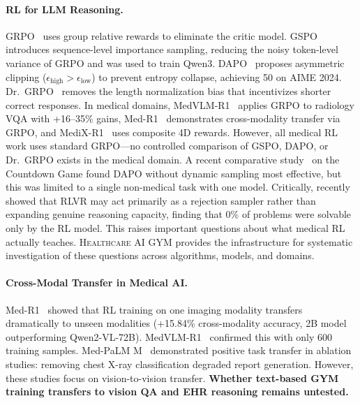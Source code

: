 \documentclass{article}
\newcommand{\gym}{\textsc{Healthcare AI GYM}}
\begin{document}
\paragraph{RL for LLM Reasoning.}
GRPO~\citep{shao2024deepseekmath} uses group relative rewards to eliminate the critic model. GSPO~\citep{gspo2025} introduces sequence-level importance sampling, reducing the noisy token-level variance of GRPO and was used to train Qwen3. DAPO~\citep{dapo2025} proposes asymmetric clipping ($\epsilon_{\text{high}} > \epsilon_{\text{low}}$) to prevent entropy collapse, achieving 50 on AIME 2024. Dr.~GRPO~\citep{liu2025drgrpo} removes the length normalization bias that incentivizes shorter correct responses. In medical domains, MedVLM-R1~\citep{pan2025medvlmr1} applies GRPO to radiology VQA with +16--35\% gains, Med-R1~\citep{lai2025medr1} demonstrates cross-modality transfer via GRPO, and MediX-R1~\citep{medixr1} uses composite 4D rewards. However, all medical RL work uses standard GRPO---no controlled comparison of GSPO, DAPO, or Dr.~GRPO exists in the medical domain. A recent comparative study~\citep{rl_comparison2025} on the Countdown Game found DAPO without dynamic sampling most effective, but this was limited to a single non-medical task with one model. Critically, \citet{yue2025rlvr} recently showed that RLVR may act primarily as a rejection sampler rather than expanding genuine reasoning capacity, finding that 0\% of problems were solvable only by the RL model. This raises important questions about what medical RL actually teaches. \gym{} provides the infrastructure for systematic investigation of these questions across algorithms, models, and domains.

\paragraph{Cross-Modal Transfer in Medical AI.}
Med-R1~\citep{lai2025medr1} showed that RL training on one imaging modality transfers dramatically to unseen modalities (+15.84\% cross-modality accuracy, 2B model outperforming Qwen2-VL-72B). MedVLM-R1~\citep{pan2025medvlmr1} confirmed this with only 600 training samples. Med-PaLM M~\citep{tu2024medpalmm} demonstrated positive task transfer in ablation studies: removing chest X-ray classification degraded report generation. However, these studies focus on vision-to-vision transfer. \textbf{Whether text-based GYM training transfers to vision QA and EHR reasoning remains untested.}
\end{document}
